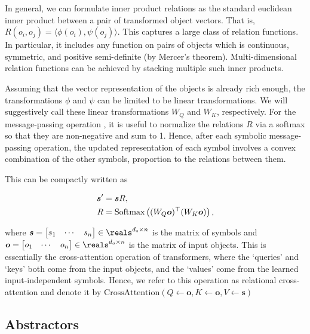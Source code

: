 In general, we can formulate inner product relations as the standard euclidean inner product between a pair of transformed object vectors. That is, $R(o_i, o_j) = \langle \phi(o_i), \psi(o_j) \rangle$. This captures a large class of relation functions. In particular, it includes any function on pairs of objects which is continuous, symmetric, and positive semi-definite (by Mercer's theorem). Multi-dimensional relation functions can be achieved by stacking multiple such inner products.

Assuming that the vector representation of the objects is already rich enough, the transformations $\phi$ and $\psi$ can be limited to be linear transformations. We will suggestively call these linear transformations $W_Q$ and $W_K$, respectively. For the message-passing operation , it is useful to normalize the relations $R$ via a softmax so that they are non-negative and sum to 1. Hence, after each symbolic message-passing operation, the updated representation of each symbol involves a convex combination of the other symbols, proportion to the relations between them.

This can be compactly written as

\begin{equation}
    \label{eq:relational_crossattention}
    \begin{split}
        \boldsymbol{s}' &= \boldsymbol{s} R, \\
        R &= \text{Softmax}\left((W_Q \boldsymbol{o})^\top (W_K \boldsymbol{o})\right),
    \end{split}
\end{equation}

\noindent where $\boldsymbol{s} = \begin{bmatrix}s_1 & \cdots & s_n \end{bmatrix} \in \reals^{d_s \times n}$ is the matrix of symbols and $\boldsymbol{o} = \begin{bmatrix}o_1 & \cdots & o_n \end{bmatrix} \in \reals^{d_o \times n}$ is the matrix of input objects. This is essentially the cross-attention operation of transformers, where the `queries' and `keys' both come from the input objects, and the `values' come from the learned input-independent symbols. Hence, we refer to this operation as relational cross-attention and denote it by $\text{CrossAttention}(Q \gets \boldsymbol{o}, K \gets \boldsymbol{o}, V \gets \boldsymbol{s})$

\subsection{Abstractors}

